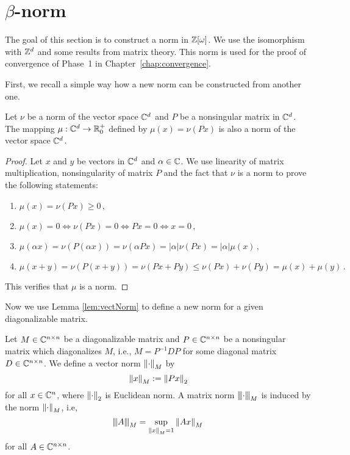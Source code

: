 \section{\texorpdfstring{$\beta$-norm}{beta-norm}}
The goal of this section is to construct a norm in $\mathbb{Z}[\omega]$. We use the isomorphism with $\mathbb{Z}^d$ and some results from matrix theory. This norm is used for the proof of convergence of Phase~1 in Chapter~\ref{chap:convergence}.

First, we recall a simple way how a new norm can be constructed from another one.

\begin{lem}
\label{lem:vectNorm}
Let $\nu$ be a norm of the vector space $\mathbb{C}^d$ and $P$ be a nonsingular matrix in $\mathbb{C}^d$. The mapping $\mu:\mathbb{C}^d\rightarrow \mathbb{R}^+_0$ defined by $\mu(x)=\nu(Px)$ is also a norm of the vector space $\mathbb{C}^d$.
\end{lem}
\begin{proof}
Let $x$ and $y$ be vectors in $\mathbb{C}^d$ and $\alpha\in \mathbb{C}$.  We use linearity of matrix multiplication, nonsingularity of matrix $P$ and the fact that $\nu$ is a norm to prove the following statements:
\begin{enumerate}
    \item $\mu(x)=\nu(Px)\geq 0\,,$
    \item $\mu(x)=0 \iff \nu(Px)=0 \iff Px=0 \iff x=0\,,$
    \item $\mu(\alpha x)=\nu(P(\alpha x))=\nu(\alpha Px)=|\alpha|\nu(Px)=|\alpha|\mu(x)\,,$
    \item $\mu(x+y)=\nu(P(x+y))=\nu(Px+Py)\leq \nu(Px)+\nu(Py)=\mu(x)+\mu(y)\,.$
\end{enumerate}
This  verifies that $\mu$ is a norm.
\end{proof}


Now we use Lemma \ref{lem:vectNorm} to define a new norm for a given diagonalizable matrix.
\begin{defn}
\label{def:newNorm}
Let $M\in\mathbb{C}^{n\times n}$ be a diagonalizable matrix and $P\in\mathbb{C}^{n\times n}$ be a nonsingular matrix which diagonalizes $M$, i.e., $M=P^{-1}DP$ for some diagonal matrix $D\in\mathbb{C}^{n\times n}$. We define a vector norm $\left\lVert\cdot\right\rVert_{M}$ by  
\begin{equation}
\left\lVert x\right\rVert_{M}:=\left\lVert Px\right\rVert_{2}
\end{equation}
for all $x\in\mathbb{C}^n$, where $\left\lVert\cdot\right\rVert_{2}$ is Euclidean norm. A matrix norm ${\left\vert\kern-0.25ex\left\vert\kern-0.25ex\left\vert \cdot\right\vert\kern-0.25ex\right\vert\kern-0.25ex\right\vert}_{M}$ is induced by the norm $\left\lVert\cdot\right\rVert_{M}$, i.e, 
$$
{\left\vert\kern-0.25ex\left\vert\kern-0.25ex\left\vert A\right\vert\kern-0.25ex\right\vert\kern-0.25ex\right\vert}_{M}=\sup_{\left\lVert x\right\rVert_{M}=1} \left\lVert Ax\right\rVert_{M}\,
$$
for all $A\in\mathbb{C}^{n\times n}$.
\end{defn}


